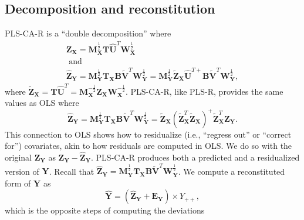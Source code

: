 \documentclass[12pt]{article}
\begin{document}
\hypertarget{decomposition-and-reconstitution}{%
\subsection{Decomposition and
reconstitution}\label{decomposition-and-reconstitution}}

\label{section:recresp}

PLS-CA-R is a ``double decomposition'' where \begin{equation}
\begin{aligned}
{\mathbf Z}_{\mathbf X} = {\mathbf M}^{\frac{1}{2}}_{\mathbf X}{\mathbf T}\widehat{\mathbf U}^{T}{\mathbf W}^{\frac{1}{2}}_{\mathbf X} \\ \text{ and } \\
\widehat{{\mathbf Z}}_{\mathbf Y} = {\mathbf M}^{\frac{1}{2}}_{\mathbf Y}{\mathbf T}_{\mathbf X}{\mathbf B}\widetilde{\mathbf V}^{T}{\mathbf W}^{\frac{1}{2}}_{\mathbf Y} = {\mathbf M}^{\frac{1}{2}}_{\mathbf Y}\widetilde{\mathbf Z}_{\mathbf X}\widehat{\mathbf U}^{{T}{+}}{\mathbf B}\widetilde{\mathbf V}^{T}{\mathbf W}^{\frac{1}{2}}_{\mathbf Y},
\label{eq:doubledecomp}
\end{aligned}
\end{equation} where
\(\widetilde{\mathbf Z}_{\mathbf X} = {\mathbf T}\widehat{\mathbf U}^{T} = {\mathbf M}_{\mathbf X}^{-\frac{1}{2}}{\mathbf Z}_{\mathbf X}{\mathbf W}_{\mathbf X}^{-\frac{1}{2}}\).
PLS-CA-R, like PLS-R, provides the same values as OLS where
\begin{equation}
\widehat{{\mathbf Z}}_{\mathbf Y} = {\mathbf M}^{\frac{1}{2}}_{\mathbf Y}{\mathbf T}_{\mathbf X}{\mathbf B}\widetilde{\mathbf V}^{T}{\mathbf W}^{\frac{1}{2}}_{\mathbf Y} = \widetilde{\mathbf Z}_{\mathbf X} (\widetilde{\mathbf Z}_{\mathbf X}^{T}\widetilde{\mathbf Z}_{\mathbf X})^{+} \widetilde{\mathbf Z}_{\mathbf X}^T {\mathbf Z}_{\mathbf Y}.
\label{ols_equivalence}
\end{equation} This connection to OLS shows how to residualize (i.e.,
``regress out'' or ``correct for'') covariates, akin to how residuals
are computed in OLS. We do so with the original
\({\mathbf Z}_{\mathbf Y}\) as
\({\mathbf Z}_{\mathbf Y} - \widehat{\mathbf Z}_{\mathbf Y}\). PLS-CA-R
produces both a predicted and a residualized version of \({\mathbf Y}\).
Recall that
\(\widehat{{\mathbf Z}}_{\mathbf Y} = {\mathbf M}^{\frac{1}{2}}_{\mathbf Y}{\mathbf T}_{\mathbf X}{\mathbf B}\widetilde{\mathbf V}^{T}{\mathbf W}^{\frac{1}{2}}_{\mathbf Y}\).
We compute a reconstituted form of \({\mathbf Y}\) as \begin{equation}
\widehat{\mathbf Y} = (\widehat{{\mathbf Z}}_{\mathbf Y} + {\mathbf E}_{\mathbf Y}) \times Y_{++},
\label{eq:Yhat}
\end{equation} which is the opposite steps of computing the deviations
\end{document}
